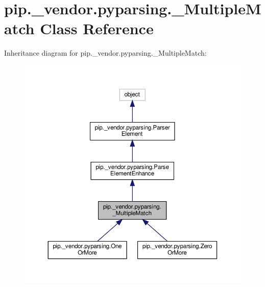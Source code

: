 \hypertarget{classpip_1_1__vendor_1_1pyparsing_1_1__MultipleMatch}{}\section{pip.\+\_\+vendor.\+pyparsing.\+\_\+\+Multiple\+Match Class Reference}
\label{classpip_1_1__vendor_1_1pyparsing_1_1__MultipleMatch}


Inheritance diagram for pip.\+\_\+vendor.\+pyparsing.\+\_\+\+Multiple\+Match\+:
\nopagebreak
\begin{figure}[H]
\begin{center}
\leavevmode
\includegraphics[width=350pt]{classpip_1_1__vendor_1_1pyparsing_1_1__MultipleMatch__inherit__graph}
\end{center}
\end{figure}


